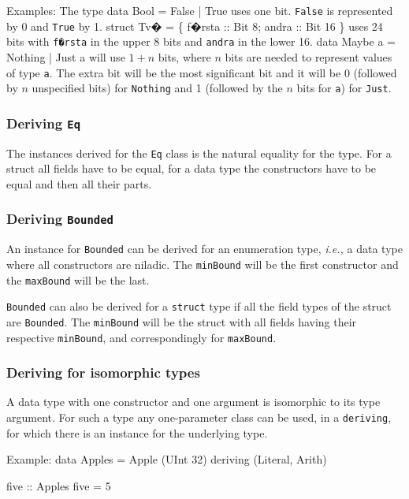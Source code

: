 \documentclass[twoside,letterpaper]{article}
\newcommand{\ie}{\emph{i.e.,}}
\newcommand{\te}[1]{\texttt{#1}}
\begin{document}
Examples: The type
\BBS
data Bool = False | True
\EBS
uses one bit.  \te{False} is represented by 0 and \te{True} by 1.
\BBS
struct Tv� = \{ f�rsta :: Bit 8; andra :: Bit 16 \}
\EBS
uses 24 bits with \te{f�rsta} in the upper 8 bits and \te{andra} in the lower 16.
\BBS
data Maybe a = Nothing | Just a
\EBS
will use $1+n$ bits, where $n$ bits are needed to represent values of
type \te{a}.  The extra bit will be the most significant bit and it
will be 0 (followed by $n$ unspecified bits) for \te{Nothing} and 1
(followed by the $n$ bits for \te{a}) for \te{Just}.


\subsubsection{Deriving \te{Eq}}

The instances derived for the \te{Eq} class is the natural equality for
the type.  For a struct all fields have to be equal, for a data type the constructors
have to be equal and then all their parts.


\subsubsection{Deriving \te{Bounded}}

An instance for \te{Bounded} can be derived for an enumeration type,
{\ie} a data type where all constructors are niladic.  The \te{minBound} will
be the first constructor and the \te{maxBound} will be the last.

\te{Bounded} can also be derived for a \te{struct} type if all the field types of
the struct are \te{Bounded}.  The \te{minBound} will be the struct with all
fields having their respective \te{minBound}, and correspondingly for \te{maxBound}.

\subsubsection{Deriving for isomorphic types}

A data type with one constructor and one argument is isomorphic to its type
argument.  For such a type any one-parameter class can be used, in a {\te{deriving}},
for which there is an instance for the underlying type.

Example:
\BBS
data Apples = Apple (UInt 32) deriving (Literal, Arith)

five :: Apples
five = 5
\end{document}
